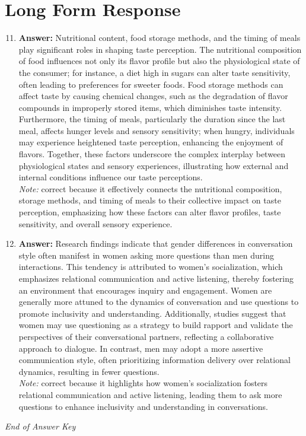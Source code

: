 \documentclass[12pt]{article}
\begin{document}
\section*{Long Form Response}
\begin{enumerate}[label=\arabic*.]
\setcounter{enumi}{10}
\item \textbf{Answer:} Nutritional content, food storage methods, and the timing of meals play significant roles in shaping taste perception. The nutritional composition of food influences not only its flavor profile but also the physiological state of the consumer; for instance, a diet high in sugars can alter taste sensitivity, often leading to preferences for sweeter foods. Food storage methods can affect taste by causing chemical changes, such as the degradation of flavor compounds in improperly stored items, which diminishes taste intensity. Furthermore, the timing of meals, particularly the duration since the last meal, affects hunger levels and sensory sensitivity; when hungry, individuals may experience heightened taste perception, enhancing the enjoyment of flavors. Together, these factors underscore the complex interplay between physiological states and sensory experiences, illustrating how external and internal conditions influence our taste perceptions.
\\ \textit{Note:} correct because it effectively connects the nutritional composition, storage methods, and timing of meals to their collective impact on taste perception, emphasizing how these factors can alter flavor profiles, taste sensitivity, and overall sensory experience.
\item \textbf{Answer:} Research findings indicate that gender differences in conversation style often manifest in women asking more questions than men during interactions. This tendency is attributed to women's socialization, which emphasizes relational communication and active listening, thereby fostering an environment that encourages inquiry and engagement. Women are generally more attuned to the dynamics of conversation and use questions to promote inclusivity and understanding. Additionally, studies suggest that women may use questioning as a strategy to build rapport and validate the perspectives of their conversational partners, reflecting a collaborative approach to dialogue. In contrast, men may adopt a more assertive communication style, often prioritizing information delivery over relational dynamics, resulting in fewer questions.
\\ \textit{Note:} correct because it highlights how women's socialization fosters relational communication and active listening, leading them to ask more questions to enhance inclusivity and understanding in conversations.
\end{enumerate}

\vfill
\noindent\textit{End of Answer Key}
\end{document}
